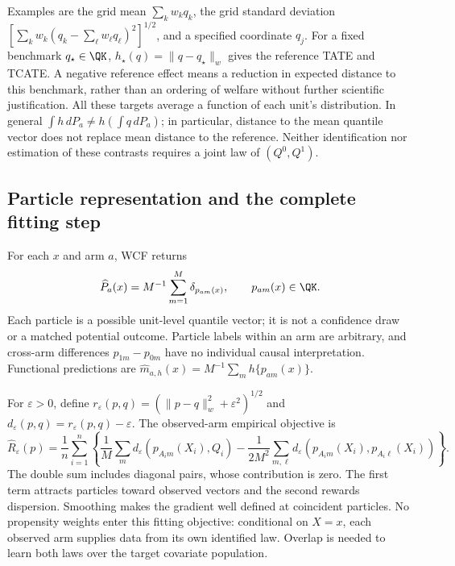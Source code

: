 Examples are the grid mean $\sum_k w_kq_k$, the grid standard deviation $[\sum_k w_k(q_k-\sum_\ell w_\ell q_\ell)^2]^{1/2}$, and a specified coordinate $q_j$. For a fixed benchmark $q_\star\in\QK$, $h_\star(q)=\|q-q_\star\|_w$ gives the reference TATE and TCATE. A negative reference effect means a reduction in expected distance to this benchmark, rather than an ordering of welfare without further scientific justification. All these targets average a function of each unit's distribution. In general $\int h\,dP_a\neq h(\int q\,dP_a)$; in particular, distance to the mean quantile vector does not replace mean distance to the reference. Neither identification nor estimation of these contrasts requires a joint law of $(Q^0,Q^1)$.

\subsection{Particle representation and the complete fitting step}

For each $x$ and arm $a$, WCF returns
\[
 \widehat P_a(x)=M^{-1}\sum_{m=1}^M\delta_{p_{am}(x)},\qquad p_{am}(x)\in\QK.
\]
Each particle is a possible unit-level quantile vector; it is not a confidence draw or a matched potential outcome. Particle labels within an arm are arbitrary, and cross-arm differences $p_{1m}-p_{0m}$ have no individual causal interpretation. Functional predictions are $\widehat m_{a,h}(x)=M^{-1}\sum_m h\{p_{am}(x)\}$.

For $\varepsilon>0$, define $r_\varepsilon(p,q)=(\|p-q\|_w^2+\varepsilon^2)^{1/2}$ and $d_\varepsilon(p,q)=r_\varepsilon(p,q)-\varepsilon$. The observed-arm empirical objective is
\begin{equation}
 \widehat R_\varepsilon(p)=\frac1n\sum_{i=1}^n
 \left\{\frac1M\sum_m d_\varepsilon(p_{A_i m}(X_i),Q_i)
 -\frac1{2M^2}\sum_{m,\ell}d_\varepsilon(p_{A_i m}(X_i),p_{A_i\ell}(X_i))\right\}.
 \label{eq:app-empirical-risk}
\end{equation}
The double sum includes diagonal pairs, whose contribution is zero. The first term attracts particles toward observed vectors and the second rewards dispersion. Smoothing makes the gradient well defined at coincident particles. No propensity weights enter this fitting objective: conditional on $X=x$, each observed arm supplies data from its own identified law. Overlap is needed to learn both laws over the target covariate population.

